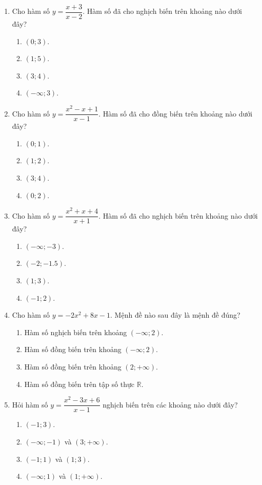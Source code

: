 \documentclass[12pt]{article}
\begin{document}
\begin{enumerate}[label=\textbf{Câu \arabic*.}]
		\item Cho hàm số $y = \dfrac{x + 3}{x - 2}$. Hàm số đã cho nghịch biến trên khoảng nào dưới đây?
		\begin{enumerate}[label=\textbf{\Alph*.}]
			\item $(0; 3)$.
			\item $(1; 5)$.
			\item $(3; 4)$.
			\item $(-\infty; 3)$.
		\end{enumerate}
		
		\item Cho hàm số $y = \dfrac{x^2 - x + 1}{x - 1}$. Hàm số đã cho đồng biến trên khoảng nào dưới đây?
		\begin{enumerate}[label=\textbf{\Alph*.}]
			\item $(0; 1)$.
			\item $(1; 2)$.
			\item $(3; 4)$.
			\item $(0; 2)$.
		\end{enumerate}
		
		\item Cho hàm số $y = \dfrac{x^2 + x + 4}{x + 1}$. Hàm số đã cho nghịch biến trên khoảng nào dưới đây?
		\begin{enumerate}[label=\textbf{\Alph*.}]
			\item $(-\infty; -3)$.
			\item $(-2; -1.5)$.
			\item $(1; 3)$.
			\item $(-1; 2)$.
		\end{enumerate}
		
		\item Cho hàm số $y = -2x^2 + 8x - 1$. Mệnh đề nào sau đây là mệnh đề đúng?
		\begin{enumerate}[label=\textbf{\Alph*.}]
			\item Hàm số nghịch biến trên khoảng $(-\infty; 2)$.
			\item Hàm số đồng biến trên khoảng $(-\infty; 2)$.
			\item Hàm số đồng biến trên khoảng $(2; +\infty)$.
			\item Hàm số đồng biến trên tập số thực $\mathbb{R}$.
		\end{enumerate}
		
		\item Hỏi hàm số $y = \dfrac{x^2 - 3x + 6}{x - 1}$ nghịch biến trên các khoảng nào dưới đây?
		\begin{enumerate}[label=\textbf{\Alph*.}]
			\item $(-1; 3)$.
			\item $(-\infty; -1)$ và $(3; +\infty)$.
			\item $(-1; 1)$ và $(1; 3)$.
			\item $(-\infty; 1)$ và $(1; +\infty)$.
		\end{enumerate}
		

\end{enumerate}
\end{document}

